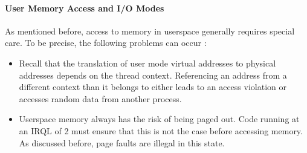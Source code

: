 \paragraph{User Memory Access and I/O Modes}
As mentioned before, access to memory in userspace generally requires special care. To be precise, the following problems can occur \cite{Yosifovich2017}:
\begin{itemize}
	\item Recall that the translation of user mode virtual addresses to physical addresses depends on the thread context. Referencing an address from a different context than it belongs to either leads to an access violation or accesses random data from another process.
	\item Userspace memory always has the risk of being paged out. Code running at an IRQL of 2 must ensure that this is not the case before accessing memory. As discussed before, page faults are illegal in this state.
\end{itemize}

